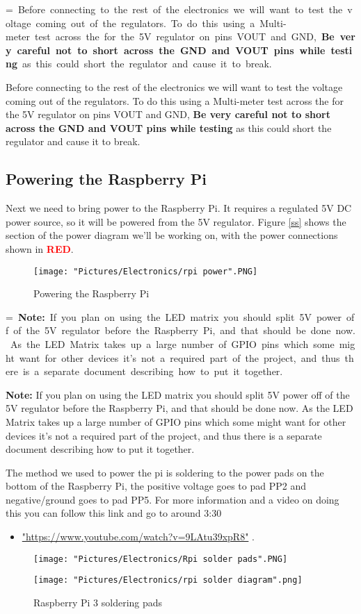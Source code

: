 \documentclass[12pt]{article}
\makeatletter
\newcommand{\mybox}[1]{%
  \setbox0=\hbox{#1}%
  \setlength{\@tempdima}{\dimexpr\wd0+13pt}%
  \begin{tcolorbox}[colframe=mycolor,boxrule=0.5pt,arc=4pt,
      left=6pt,right=6pt,top=6pt,bottom=6pt,boxsep=0pt,width=0.95\textwidth]
    #1
  \end{tcolorbox}
}
\makeatother
\begin{document}
\mybox{
Before connecting to the rest of the electronics we will want to test the voltage coming out of the regulators. To do this using a Multi-meter test across the  for the 5V regulator on pins VOUT and GND, \textbf{Be very careful not to short across the GND and VOUT pins while testing} as this could short the regulator and cause it to break.
}

\subsection{Powering the Raspberry Pi}
Next we need to bring power to the Raspberry Pi. It requires a regulated 5V DC power source, so it will be powered from the 5V regulator. Figure \ref{ss} shows the section of the power diagram we'll be working on, with the power connections shown in \textcolor{red}{\textbf{RED}}.

\begin{figure}[H]
  	\centering
    	\texttt{[image: "Pictures/Electronics/rpi power".PNG]}
 	\caption{Powering the Raspberry Pi}
	\label{rpi power}
\end{figure}

\mybox{
\textbf{Note:} If you plan on using the LED matrix you should split 5V power off of the 5V regulator before the Raspberry Pi, and that should be done now. As the LED Matrix takes up a large number of GPIO pins which some might want for other devices it's not a required part of the project, and thus there is a separate document describing how to put it together.
} 


\noindent The method we used to power the pi is soldering to the power pads on the bottom of the Raspberry Pi, the positive voltage goes to pad PP2 and negative/ground goes to pad PP5. For more information and a video on doing this you can follow this link and go to around 3:30 
\begin{itemize}
	\item \href{"https://www.youtube.com/watch?v=9LAtu39xpR8"}{"https://www.youtube.com/watch?v=9LAtu39xpR8"} . 
\end{itemize}

\begin{figure}[H]
 	\centering
  	\begin{minipage}[b]{0.40\textwidth}
		\texttt{[image: "Pictures/Electronics/Rpi solder pads".PNG]}
  	\end{minipage}
  	\hfill
  	\begin{minipage}[b]{0.50\textwidth}
    		\texttt{[image: "Pictures/Electronics/rpi solder diagram".png]}
  	\end{minipage}
	\caption{Raspberry Pi 3 soldering pads}
	\label{rpi pads}
\end{figure}
\end{document}
